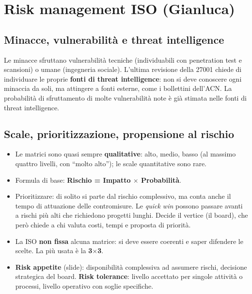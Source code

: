 \section{Risk management ISO (Gianluca)}

\subsection{Minacce, vulnerabilità e threat intelligence}
Le minacce sfruttano vulnerabilità tecniche (individuabili con penetration test e scansioni) o umane
(ingegneria sociale). L'ultima revisione della 27001 chiede di individuare le proprie \textbf{fonti di
threat intelligence}: non si deve conoscere ogni minaccia da soli, ma attingere a fonti esterne, come i
bollettini dell'ACN. La probabilità di sfruttamento di molte vulnerabilità note è già stimata nelle fonti
di threat intelligence.

\subsection{Scale, prioritizzazione, propensione al rischio}
\begin{itemize}
  \item Le matrici sono quasi sempre \textbf{qualitative}: alto, medio, basso (al massimo quattro livelli,
    con ``molto alto''); le scale quantitative sono rare.
  \item Formula di base: \textbf{Rischio = Impatto $\times$ Probabilità}.
  \item Prioritizzare: di solito si parte dal rischio complessivo, ma conta anche il tempo di attuazione
    delle contromisure. Le \emph{quick win} possono passare avanti a rischi più alti che richiedono
    progetti lunghi. Decide il vertice (il board), che però chiede a chi valuta costi, tempi e proposta di
    priorità.
  \item La ISO \textbf{non fissa} alcuna matrice: si deve essere coerenti e saper difendere le scelte. La
    più usata è la \textbf{3$\times$3}.
  \item \textbf{Risk appetite} (slide): disponibilità complessiva ad assumere rischi, decisione strategica
    del board. \textbf{Risk tolerance}: livello accettato per singole attività o processi, livello
    operativo con soglie specifiche.
\end{itemize}

